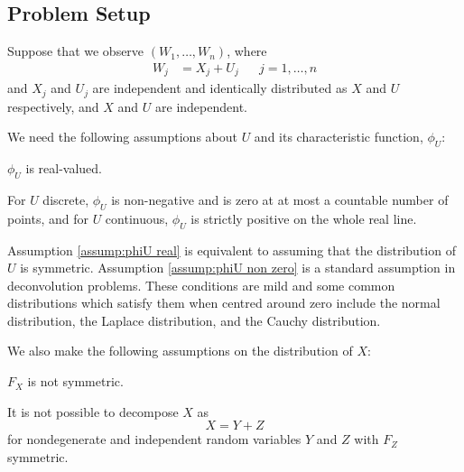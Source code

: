 	\subsection{Problem Setup}
	Suppose that we observe $(W_1, \dots, W_n)$, where
	\begin{align}
		W_j &= X_j + U_j &&j = 1, \dots, n
	\end{align}
	and $X_j$ and $U_j$ are independent and identically distributed as $X$ and $U$ respectively, and $X$ and $U$ are independent. 


	We need the following assumptions about $U$ and its characteristic function, $\phi_U$:
	\begin{assumption}
	\label{assump:phiU real}
		$\phi_U$ is real-valued.
	\end{assumption}
	\begin{assumption}
	\label{assump:phiU non zero}
		For $U$ discrete, $\phi_U$ is non-negative and is zero at at most a countable number of points, and for $U$ continuous, $\phi_U$ is strictly positive on the whole real line.
	\end{assumption}

	Assumption \ref{assump:phiU real} is equivalent to assuming that the distribution of $U$ is symmetric. Assumption \ref{assump:phiU non zero} is a standard assumption in deconvolution problems. These conditions are mild and some common distributions which satisfy them when centred around zero include the normal distribution, the Laplace distribution, and the Cauchy distribution.


	We also make the following assumptions on the distribution of $X$:
	\begin{assumption}
	\label{assumpt: X not symmetric}
		$F_X$ is not symmetric.
	\end{assumption}
	\begin{assumption}
		\label{assump: X indecomposable}
		It is not possible to decompose $X$ as
		\begin{equation}
			X = Y + Z
		\end{equation}
		for nondegenerate and independent random variables $Y$ and $Z$ with $F_Z$ symmetric.
	\end{assumption}

